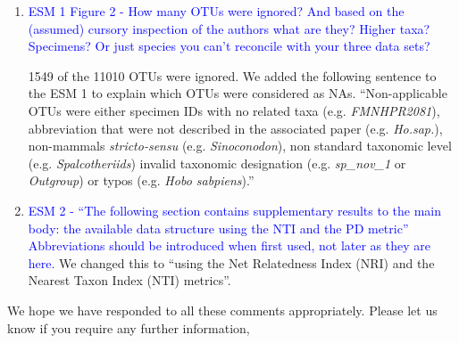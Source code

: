\documentclass[12pt,letterpaper]{article}
\begin{document}
\begin{enumerate}
\item{\textcolor{blue}{ESM 1 Figure 2 - How many OTUs were ignored? And based on the (assumed) cursory inspection of the authors what are they? Higher taxa? Specimens? Or just species you can't reconcile with your three data sets?}}

1549 of the 11010 OTUs were ignored.
We added the following sentence to the ESM 1 to explain which OTUs were considered as NAs.
``Non-applicable OTUs were either specimen IDs with no related taxa (e.g. \textit{FMNHPR2081}), abbreviation that were not described in the associated paper (e.g. \textit{Ho.sap.}), non-mammals \textit{stricto-sensu} (e.g. \textit{Sinoconodon}), non standard taxonomic level (e.g. \textit{Spalcotheriids}) invalid taxonomic designation (e.g. \textit{sp\_nov\_1} or \textit{Outgroup}) or typos (e.g. \textit{Hobo sabpiens}).''

\item{\textcolor{blue}{ESM 2 - ``The following section contains supplementary results to the main body: the available data structure using the NTI and the PD metric'' Abbreviations should be introduced when first used, not later as they are here.}}
We changed this to ``using the Net Relatedness Index (NRI) and the Nearest Taxon Index (NTI) metrics''.

\end{enumerate}



We hope we have responded to all these comments appropriately. Please let us know if you require any further information,\\
\bigskip



\end{document}

